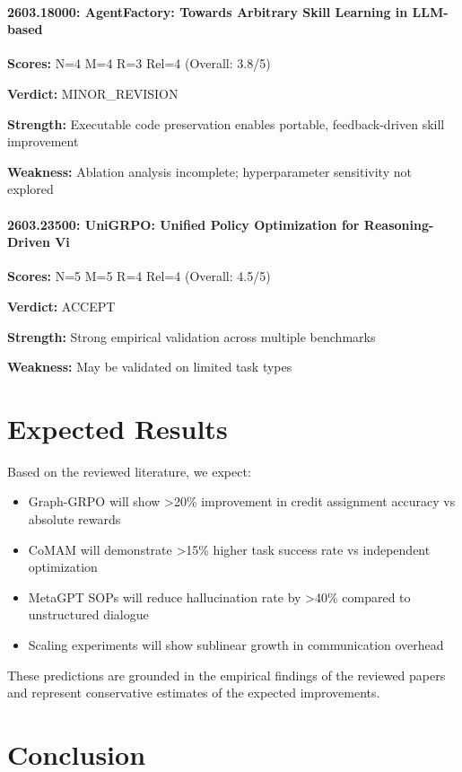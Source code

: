 \documentclass[11pt]{article}
\begin{document}
\paragraph{2603.18000: AgentFactory: Towards Arbitrary Skill Learning in LLM-based }
{\bf Scores:} N=4 M=4 R=3 Rel=4 (Overall: 3.8/5)

{\bf Verdict:} MINOR_REVISION

{\bf Strength:} Executable code preservation enables portable, feedback-driven skill improvement

{\bf Weakness:} Ablation analysis incomplete; hyperparameter sensitivity not explored


\paragraph{2603.23500: UniGRPO: Unified Policy Optimization for Reasoning-Driven Vi}
{\bf Scores:} N=5 M=5 R=4 Rel=4 (Overall: 4.5/5)

{\bf Verdict:} ACCEPT

{\bf Strength:} Strong empirical validation across multiple benchmarks

{\bf Weakness:} May be validated on limited task types


\section{Expected Results}

Based on the reviewed literature, we expect:

\begin{itemize}
\item Graph-GRPO will show >20\% improvement in credit assignment accuracy vs absolute rewards
\item CoMAM will demonstrate >15\% higher task success rate vs independent optimization
\item MetaGPT SOPs will reduce hallucination rate by >40\% compared to unstructured dialogue
\item Scaling experiments will show sublinear growth in communication overhead
\end{itemize}

These predictions are grounded in the empirical findings of the reviewed papers
and represent conservative estimates of the expected improvements.

\section{Conclusion}
\end{document}
